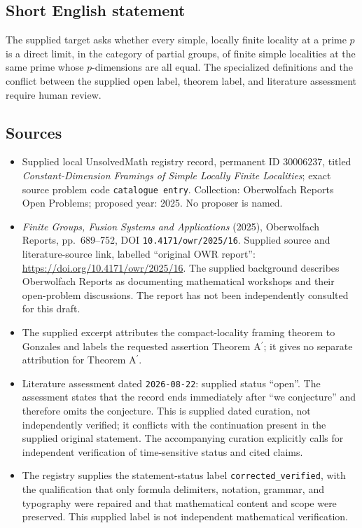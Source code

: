 \documentclass[11pt]{article}
\begin{document}
\subsection{Short English statement}
The supplied target asks whether every simple, locally finite locality at a prime \(p\) is a direct limit, in the category of partial groups, of finite simple localities at the same prime whose \(p\)-dimensions are all equal. The specialized definitions and the conflict between the supplied open label, theorem label, and literature assessment require human review.
\subsection{Sources}
\begin{itemize}
\item Supplied local UnsolvedMath registry record, permanent ID \(30006237\), titled \emph{Constant-Dimension Framings of Simple Locally Finite Localities}; exact source problem code \texttt{catalogue entry}. Collection: Oberwolfach Reports Open Problems; proposed year: 2025. No proposer is named.
\item \emph{Finite Groups, Fusion Systems and Applications} (2025), Oberwolfach Reports, pp.\ 689--752, DOI \texttt{10.4171/owr/2025/16}. Supplied source and literature-source link, labelled ``original OWR report'': \url{https://doi.org/10.4171/owr/2025/16}. The supplied background describes Oberwolfach Reports as documenting mathematical workshops and their open-problem discussions. The report has not been independently consulted for this draft.
\item The supplied excerpt attributes the compact-locality framing theorem to Gonzales and labels the requested assertion Theorem A\(^{\prime}\); it gives no separate attribution for Theorem A\(^{\prime}\).
\item Literature assessment dated \texttt{2026-08-22}: supplied status ``open''. The assessment states that the record ends immediately after ``we conjecture'' and therefore omits the conjecture. This is supplied dated curation, not independently verified; it conflicts with the continuation present in the supplied original statement. The accompanying curation explicitly calls for independent verification of time-sensitive status and cited claims.
\item The registry supplies the statement-status label \texttt{corrected\_verified}, with the qualification that only formula delimiters, notation, grammar, and typography were repaired and that mathematical content and scope were preserved. This supplied label is not independent mathematical verification.
\end{itemize}
\end{document}
